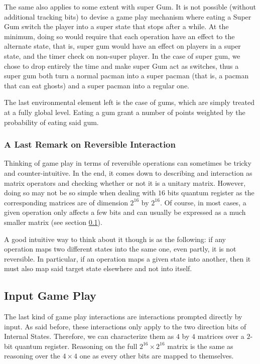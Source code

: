 \documentclass[a4paper]{article}
\begin{document}
The same also applies to some extent with super Gum. It is not possible (without additional tracking bits) to devise a game play mechanism where eating a Super Gum switch the player into a super state that stops after a while. At the minimum, doing so would require that each operation have an effect to the alternate state, that is, super gum would have an effect on players in a super state, and the timer check on non-super player. In the case of super gum, we chose to drop entirely the time and make super Gum act as switches, thus a super gum both turn a normal pacman into a super pacman (that is, a pacman that can eat ghosts) and a super pacman into a regular one.

The last environmental element left is the case of gums, which are simply treated at a fully global level. Eating a gum grant a number of points weighted by the probability of eating said gum. 

\subsubsection{A Last Remark on Reversible Interaction}

Thinking of game play in terms of reversible operations can sometimes be tricky and counter-intuitive. In the end, it comes down to describing and interaction as matrix operators and checking whether or not it is a unitary matrix. However, doing so may not be so simple when dealing with $16$ bits quantum register as the corresponding matrices are of dimension $2^{16}$ by $2^{16}$. Of course, in most cases, a given operation only affects a few bits and can usually be expressed as a much smaller matrix (see section \ref{sec:input}). 

A good intuitive way to think about it though is as the following: if any operation maps two different states into the same one, even partly, it is not reversible. In particular, if an operation maps a given state into another, then it must also map said target state elsewhere and not into itself.

\subsection{Input Game Play} \label{sec:input}

The last kind of game play interactions are interactions prompted directly by input. As said before, these interactions only apply to the two direction bits of Internal States. Therefore, we can characterize them as $4$ by $4$ matrices over a $2$- bit quantum register. Reasoning on the full $2^{16} \times 2^{16}$ matrix is the same as reasoning over the $4 \times 4$ one as every other bits are mapped to themselves.  
\end{document}
